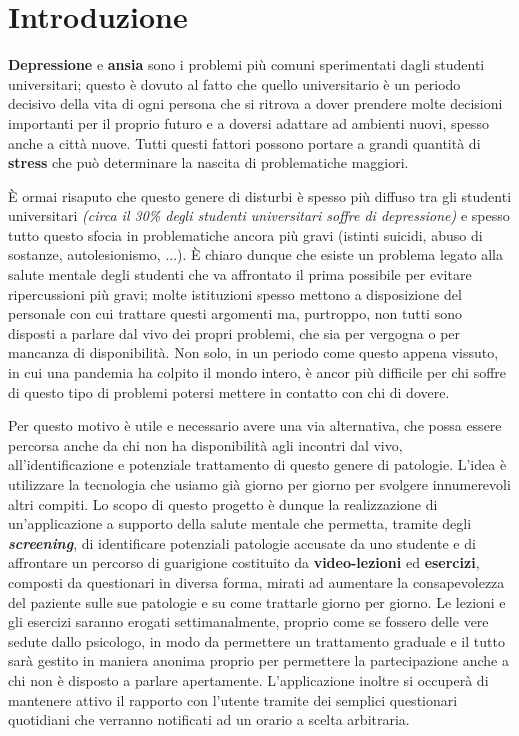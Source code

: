 \cleardoublepage
{}
{}
\chapter*{Introduzione}

\textbf{Depressione} e \textbf{ansia} sono i problemi più comuni sperimentati dagli studenti universitari; questo è dovuto al fatto che quello universitario è un periodo decisivo della vita di ogni persona che si
ritrova a dover prendere molte decisioni importanti per il proprio futuro e a doversi adattare ad ambienti nuovi, spesso anche a città nuove.
Tutti questi fattori possono portare a grandi quantità di \textbf{stress} che può determinare la nascita di problematiche maggiori.

È ormai risaputo che questo genere di disturbi è spesso più diffuso tra gli studenti universitari \textit{(circa il 30\% degli studenti universitari soffre di depressione)} \cite{MilanoSFU} e spesso tutto questo sfocia in problematiche ancora più gravi (istinti suicidi, abuso di sostanze, autolesionismo, ...).
È chiaro dunque che esiste un problema legato alla salute mentale degli studenti che va
affrontato il prima possibile per evitare ripercussioni più gravi; molte istituzioni spesso mettono a disposizione del personale con cui trattare questi argomenti ma, purtroppo, non tutti sono disposti a parlare dal vivo dei propri problemi, che sia per vergogna o per mancanza di disponibilità. Non solo, in un periodo come questo appena vissuto, in cui una pandemia ha colpito il mondo intero, è ancor più difficile per chi soffre di questo tipo di problemi potersi mettere in contatto con chi di dovere.

Per questo motivo è utile e necessario avere una via alternativa, che possa essere percorsa anche da chi non ha disponibilità agli incontri dal vivo, all'identificazione e potenziale trattamento di questo genere di patologie. L'idea è utilizzare la tecnologia che usiamo già giorno per giorno per svolgere innumerevoli altri compiti.
Lo scopo di questo progetto è dunque la realizzazione di un'applicazione a supporto della salute mentale che permetta, tramite degli \textbf{\textit{screening}}, di identificare potenziali patologie accusate da uno studente e di affrontare un percorso di guarigione costituito da \textbf{video-lezioni} ed \textbf{esercizi}, composti da questionari in diversa forma, mirati ad aumentare la consapevolezza del paziente sulle sue patologie e su come trattarle giorno per giorno.
Le lezioni e gli esercizi saranno erogati settimanalmente, proprio come se fossero delle vere sedute dallo psicologo, in modo da permettere un trattamento graduale e il tutto sarà gestito in maniera anonima proprio per permettere la partecipazione anche a chi non è disposto a parlare apertamente.
L'applicazione inoltre si occuperà di mantenere attivo il rapporto con l'utente tramite dei semplici questionari quotidiani che verranno notificati ad un orario a scelta arbitraria.

